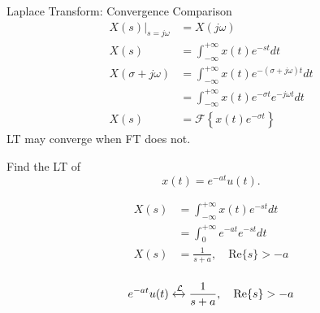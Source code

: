 \begin{frame}{Laplace Transform: Convergence Comparison}
    \begin{align*}
        \left.X(s)\right|_{s=j\omega} &= X(j\omega)\\
        X(s) &= \int_{-\infty}^{+\infty}x(t)e^{-st}dt\\
        X(\sigma + j\omega) &= \int_{-\infty}^{+\infty}x(t)e^{-(\sigma + j\omega)t}dt\\
        &= \int_{-\infty}^{+\infty}x(t)e^{-\sigma t}e^{-j\omega t}dt\\
        X(s) &= \mathcal{F}\left\{ x(t)e^{-\sigma t}\right\}
    \end{align*}
    {
        LT may converge when FT does not.
    }
\end{frame}

\begin{frame}[t,allowframebreaks]{}
    \begin{example}
        Find the LT of
        \begin{equation*}
            x(t) = e^{-at}u(t).
        \end{equation*}
    \end{example}

    {
        \begin{solution}\end{solution}
            \begin{align*}
                X(s) &= \int_{-\infty}^{+\infty}x(t)e^{-st}dt\\
                &= \int_{0}^{+\infty}e^{-at}e^{-st}dt\\
                X(s) &= \frac{1}{s+a}, \quad \mathrm{Re}\{s\} > -a\\
            \end{align*}

            \begin{equation*}
                e^{-at}u(t) \xleftrightarrow{\mathcal{L}}   \frac{1}{s+a}, \quad \mathrm{Re}\{s\} > -a
            \end{equation*}

    }

\end{frame}

